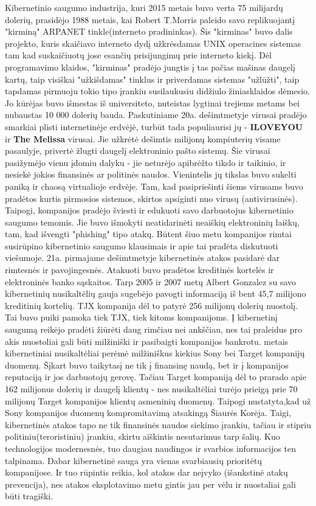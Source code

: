 Kibernetinio saugumo industrija, kuri 2015 metais buvo verta 75 milijardų dolerių, prasidėjo 1988 metais, kai Robert T.Morris paleido savo replikuojantį "kirminą" ARPANET tinkle(interneto pradininkas). Šis "kirminas" buvo dalis projekto, kuris skaičiavo interneto dydį užkrėsdamas UNIX operacines sistemas tam kad suskaičiuotų jose esančių prisijungimų prie interneto kiekį. Dėl programavimo klaidos, "kirminas" pradėjo jungtis į tas pačias mašinas daugelį kartų, taip visiškai "užkišdamas" tinklus ir priverdamas sistemas "užlūžti", taip tapdamas pirmuoju tokio tipo įrankiu susilaukusiu didžiulo žiniasklaidos dėmesio. Jo kūrėjas buvo išmestas iš universiteto, nuteistas lygtinai trejiems metams bei nubaustas 10 000 dolerių bauda. \newline Paskutiniame 20a. dešimtmetyje virusai pradėjo smarkiai plisti internetinėje erdvėjė, turbūt tada populiaurisi jų - \textbf{ILOVEYOU} ir \textbf{The Melissa} virusai. Jie užkrėtė dešimtis milijonų kompiuterių visame pasaulyje, privertė žlugti daugelį elektroninio pašto sistemų. Šie virusai pasižymėjo vienu įdomiu dalyku - jie neturėjo apibrėžto tikslo ir taikinio, ir nesiekė jokios finansinės ar politinės naudos. Vienintelis jų tikslas buvo sukelti paniką ir chaosą virtualioje erdvėje. Tam, kad pasipriešinti šiems virusams buvo pradėtos kurtis pirmosios sistemos, skirtos apsiginti nuo virusų (antivirusinės). Taipogi, kompanijos pradėjo šviesti ir edukuoti savo darbuotojus kibernetinio saugumo temomis. Jie buvo išmokyti neatidarinėti neaiškių elektroninių laiškų, tam, kad išvengti "phishing" tipo atakų. Būtent šiuo metu kompanijos rimtai susirūpino kibernetinio saugumo klausimais ir apie tai pradėta diskutuoti viešumoje. \newline 21a. pirmajame dešimtmetyje kibernetinės atakos pasidarė dar rimtesnės ir pavojingesnės. Atakuoti buvo pradėtos kreditinės kortelės ir elektroninės banko sąskaitos. Tarp 2005 ir 2007 metų Albert Gonzalez su savo kibernetinių nusikaltėlių gauja sugebėjo pavogti informaciją iš bent 45,7 milijono kreditinių kortelių. TJX kompanija dėl to patyrė 256 milijonų dolerių nuostolį. Tai buvo puiki pamoka tiek TJX, tiek kitoms kompanijoms. Į kibernetinį saugumą reikėjo pradėti žiūrėti daug rimčiau nei ankščiau, nes tai praleidus pro akis nuostoliai gali būti milžiniški ir pasibaigti kompanijos bankrotu.  metais kibernetiniai nusikaltėliai perėmė milžiniškus kiekius Sony bei Target kompanijų duomenų. Šįkart buvo taikytasį ne tik į finansinę naudą, bet ir į kompanijos reputaciją ir jos darbuotojų gerovę. Tačiau Target kompaniją dėl to prarado apie 162 milijonus dolerių ir daugelį klientų - nes nusikaltėliai turėjo prieigą prie 70 milijonų Target kompanijos klientų asmeninių duomenų. Taipogi nustatyta,kad už Sony kompanijos duomenų kompromitavimą atsakingą Šiaurės Korėja. Taigi, kibernetinės atakos tapo ne tik finansinės naudos siekimo įrankiu, tačiau ir stipriu politiniu(teroristiniu) įrankiu, skirtu aiškintis nesutarimus tarp šalių. Kuo technologijos modernesnės, tuo daugiau naudingos ir svarbios informacijos ten talpinama. Dabar kibernetinė sauga yra vienas svarbiausių prioritėtų kompanijose. Ir tuo rūpintis reikia, kol atakos dar neįvyko (išankstinė atakų prevencija), nes atakos eksplotavimo metu gintis jau per vėlu ir nuostaliai gali būti tragiški.

